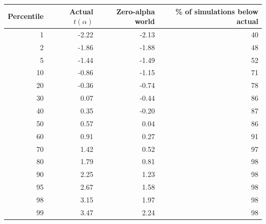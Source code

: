 \begin{tabular}{rrrr}
\toprule
Percentile & Actual $t(\alpha)$ & Zero-alpha world & \% of simulations below actual \\
\midrule
1 & -2.22 & -2.13 & 40 \\
2 & -1.86 & -1.88 & 48 \\
5 & -1.44 & -1.49 & 52 \\
10 & -0.86 & -1.15 & 71 \\
20 & -0.36 & -0.74 & 78 \\
30 & 0.07 & -0.44 & 86 \\
40 & 0.35 & -0.20 & 87 \\
50 & 0.57 & 0.04 & 86 \\
60 & 0.91 & 0.27 & 91 \\
70 & 1.42 & 0.52 & 97 \\
80 & 1.79 & 0.81 & 98 \\
90 & 2.25 & 1.23 & 98 \\
95 & 2.67 & 1.58 & 98 \\
98 & 3.15 & 1.97 & 98 \\
99 & 3.47 & 2.24 & 98 \\
\bottomrule
\end{tabular}

